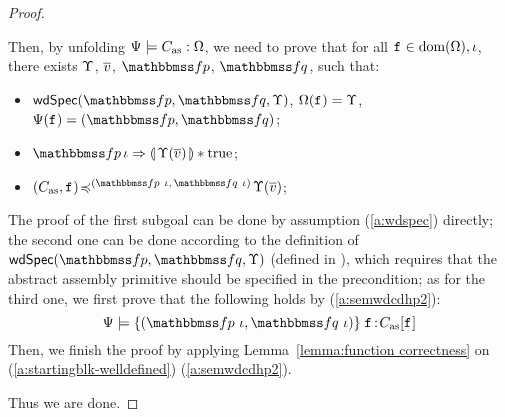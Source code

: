 \begin{proof}
\begin{itemize}
            Then, by unfolding ${\Psi} \models {C_{\text{as}}} : {\Omega}$,
            we need to prove that for all $\texttt{f}_{} \in \text{dom}(\Omega),
            \iota$, there exists $\Upsilon$, $\overline{v}$,
            $\relspecpre$, $\relspecpost$, such that:
            \begin{itemize}
                \small
                \item $\wdSpec{\relspecpre}{\relspecpost}{\hprim}$,
                    $\Omega(\texttt{f}_{}) = \Upsilon$,
                    $\Cspec(\lab{}) = (\relspecpre, \relspecpost)$;
                \item $\relspecpre \, \lgvl \Rightarrow
                    \safePrimAst{\, \hprim(\args{\val}) \,}
                    \sepstar \atrue$;
                \item $\simFunction{(\asmimp, \lab{})}
                    {(\relspecpre \ \lgvl, \,\relspecpost \ \lgvl)}
                    {\hprim(\args{\val})}$;
            \end{itemize}
            The proof of the first subgoal can be done by
            assumption (\ref{a:wdspec}) directly; the second
            one can be done according to the definition of
            $\wdSpec{\relspecpre}{\relspecpost}{\hprim}$
            (defined in \Def{\ref{def:well-defined specification}}),
            which requires that the abstract assembly primitive should
            be specified in the precondition; as for the
            third one, we first prove that the following
            holds by (\ref{a:semwdcdhp2}):
            \begin{equation}
                \semwfseqrel{\Cspec}{\relspecpre \ \lgvl}
                    {\relspecpost \ \lgvl}{\asmimp[\lab{}]}
                \label{a:startingblk-welldefined}
            \end{equation}
            Then, we finish the proof by 
            applying Lemma~\ref{lemma:function correctness} 
            on (\ref{a:startingblk-welldefined})
            (\ref{a:semwdcdhp2}).
    \end{itemize}
    Thus we are done.
\end{proof}

